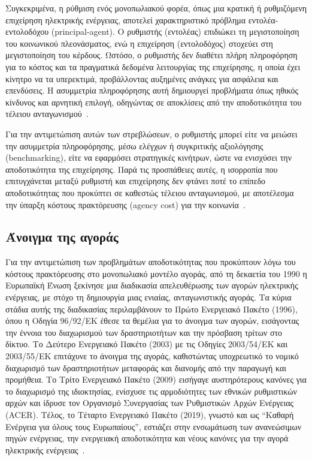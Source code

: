 Συγκεκριμένα, η ρύθμιση ενός μονοπωλιακού φορέα, όπως μια κρατική ή ρυθμιζόμενη επιχείρηση ηλεκτρικής ενέργειας, αποτελεί χαρακτηριστικό πρόβλημα εντολέα-εντολοδόχου (principal-agent). Ο ρυθμιστής (εντολέας) επιδιώκει τη μεγιστοποίηση του κοινωνικού πλεονάσματος, ενώ η επιχείρηση (εντολοδόχος) στοχεύει στη μεγιστοποίηση του κέρδους. Ωστόσο, ο ρυθμιστής δεν διαθέτει πλήρη πληροφόρηση για το κόστος και τα πραγματικά δεδομένα λειτουργίας της επιχείρησης, η οποία έχει κίνητρο να τα υπερεκτιμά, προβάλλοντας αυξημένες ανάγκες για ασφάλεια και επενδύσεις. Η ασυμμετρία πληροφόρησης αυτή δημιουργεί προβλήματα όπως ηθικός κίνδυνος και αρνητική επιλογή, οδηγώντας σε αποκλίσεις από την αποδοτικότητα του τέλειου ανταγωνισμού~\cite{grossman-hart1992}.

Για την αντιμετώπιση αυτών των στρεβλώσεων, ο ρυθμιστής μπορεί είτε να μειώσει την ασυμμετρία πληροφόρησης, μέσω ελέγχων ή συγκριτικής αξιολόγησης (benchmarking), είτε να εφαρμόσει στρατηγικές κινήτρων, ώστε να ενισχύσει την αποδοτικότητα της επιχείρησης. Παρά τις προσπάθειες αυτές, η ισορροπία που επιτυγχάνεται μεταξύ ρυθμιστή και επιχείρησης δεν φτάνει ποτέ το επίπεδο αποδοτικότητας που προκύπτει σε καθεστώς τέλειου ανταγωνισμού, με αποτέλεσμα την ύπαρξη κόστους πρακτόρευσης (agency cost) για την κοινωνία~\cite{panda-leepsa2017}.

\subsection{Άνοιγμα της αγοράς}
\label{subsec:market-liberalization}

Για την αντιμετώπιση των προβλημάτων αποδοτικότητας που προκύπτουν λόγω του κόστους πρακτόρευσης στο μονοπωλιακό μοντέλο αγοράς, από τη δεκαετία του 1990 η Ευρωπαϊκή Ένωση ξεκίνησε μια διαδικασία απελευθέρωσης των αγορών ηλεκτρικής ενέργειας, με στόχο τη δημιουργία μιας ενιαίας, ανταγωνιστικής αγοράς. Τα κύρια στάδια αυτής της διαδικασίας περιλαμβάνουν το Πρώτο Ενεργειακό Πακέτο (1996), όπου η Οδηγία 96/92/ΕΚ έθεσε τα θεμέλια για το άνοιγμα των αγορών, εισάγοντας την έννοια του διαχωρισμού των δραστηριοτήτων και την πρόσβαση τρίτων στο δίκτυο. Το Δεύτερο Ενεργειακό Πακέτο (2003) με τις Οδηγίες 2003/54/ΕΚ και 2003/55/ΕΚ επιτάχυνε το άνοιγμα της αγοράς, καθιστώντας υποχρεωτικό το νομικό διαχωρισμό των δραστηριοτήτων μεταφοράς και διανομής από την παραγωγή και προμήθεια. Το Τρίτο Ενεργειακό Πακέτο (2009) εισήγαγε αυστηρότερους κανόνες για το διαχωρισμό της ιδιοκτησίας, ενίσχυσε τις αρμοδιότητες των εθνικών ρυθμιστικών αρχών και ίδρυσε τον Οργανισμό Συνεργασίας των Ρυθμιστικών Αρχών Ενέργειας (ACER). Τέλος, το Τέταρτο Ενεργειακό Πακέτο (2019), γνωστό και ως ``Καθαρή Ενέργεια για όλους τους Ευρωπαίους'', εστιάζει στην ενσωμάτωση των ανανεώσιμων πηγών ενέργειας, την ενεργειακή αποδοτικότητα και νέους κανόνες για την αγορά ηλεκτρικής ενέργειας~\cite{eikeland-duffield2011, eu-energy-packages}.

